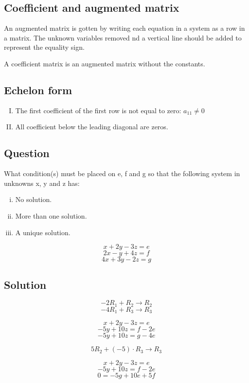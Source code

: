 \documentclass{book}
\begin{document}
\subsection{Coefficient and augmented matrix}

An augmented matrix is gotten by writing each equation in a system as a row in a matrix. The unknown variables removed nd a vertical line should be added to represent the equality sign.

A coefficient matrix is an augmented matrix without the constants.


\subsection{Echelon form}

\begin{enumerate}[I.]
	\item The first coefficient of the first row is not equal to zero: \(a_{11} \ne 0\)
	\item All coefficient below the leading diagonal are zeros.
\end{enumerate}

\subsection{Question}

What condition(s) must be placed on e, f and g so that the following system in unknowns x, y and z has:

\begin{enumerate}[(i)]
	\item No solution.
	\item More than one solution.
	\item A unique solution.
\end{enumerate}

\[x + 2y - 3z = e\]
\[2x - y + 4z = f\]
\[4x + 3y - 2z = g\]

\subsection*{Solution}
\[-2 R_1 + R_2 \rightarrow R_2\]
\[-4 R_1 + R_3 \rightarrow R_3\]

\[x + 2y - 3z = e\]
\[-5y + 10z = f - 2e\]
\[-5y + 10z = g - 4e\]

\[5 R_2 + (-5) \cdot R_3 \rightarrow R_3\]

\[x + 2y - 3z = e\]
\[-5y + 10z = f - 2e\]
\[0 = -5g + 10e + 5f\]
\end{document}
